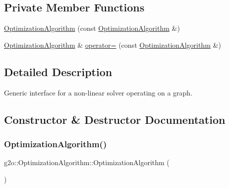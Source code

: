 \subsection*{Private Member Functions}
\begin{DoxyCompactItemize}
\item 
\mbox{\hyperlink{classg2o_1_1_optimization_algorithm_af4bf8ed80e63df3f1a066e8b0098eb27}{Optimization\+Algorithm}} (const \mbox{\hyperlink{classg2o_1_1_optimization_algorithm}{Optimization\+Algorithm}} \&)
\item 
\mbox{\hyperlink{classg2o_1_1_optimization_algorithm}{Optimization\+Algorithm}} \& \mbox{\hyperlink{classg2o_1_1_optimization_algorithm_a74d342220fa0b1588e21f61959ff414a}{operator=}} (const \mbox{\hyperlink{classg2o_1_1_optimization_algorithm}{Optimization\+Algorithm}} \&)
\end{DoxyCompactItemize}


\subsection{Detailed Description}
Generic interface for a non-\/linear solver operating on a graph. 

\subsection{Constructor \& Destructor Documentation}
\mbox{\label{classg2o_1_1_optimization_algorithm_a205013e0425b7bbae01cd16caf500ebb}} 
\subsubsection{\texorpdfstring{Optimization\+Algorithm()}{OptimizationAlgorithm()}\hspace{0.1cm}{\footnotesize\ttfamily [1/2]}}
{\footnotesize\ttfamily g2o\+::\+Optimization\+Algorithm\+::\+Optimization\+Algorithm (\begin{DoxyParamCaption}{ }\end{DoxyParamCaption})}

\mbox{\label{classg2o_1_1_optimization_algorithm_af2516e3d66596ec9c9dfdd08d48e90f9}} 
